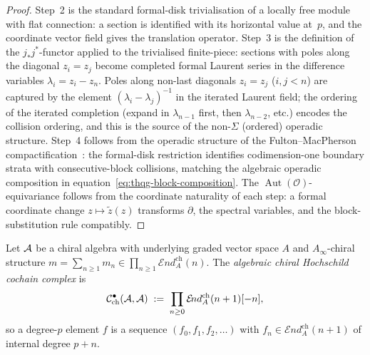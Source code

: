 \begin{proof}
Step~2 is the standard formal-disk trivialisation of a locally
free module with flat connection: a section is identified with its
horizontal value at~$p$, and the coordinate vector field gives the
translation operator. Step~3 is the definition of the
$j_* j^*$-functor applied to the trivialised finite-piece: sections
with poles along the diagonal $z_i = z_j$ become completed formal
Laurent series in the difference variables $\lambda_i = z_i - z_n$.
Poles along non-last diagonals $z_i = z_j$ ($i, j < n$) are
captured by the element $(\lambda_i - \lambda_j)^{-1}$ in the
iterated Laurent field; the ordering of the iterated completion
(expand in $\lambda_{n-1}$ first, then $\lambda_{n-2}$, etc.)
encodes the collision ordering, and this is the source of the
non-$\Sigma$ (ordered) operadic structure.
Step~4 follows from the operadic structure of the
Fulton--MacPherson compactification~\cite{FM94}: the formal-disk
restriction identifies codimension-one boundary strata with
consecutive-block collisions, matching the algebraic operadic
composition in equation~\eqref{eq:thqg-block-composition}. The
$\operatorname{Aut}(\mathcal{O})$-equivariance follows from the
coordinate naturality of each step: a formal coordinate change
$z \mapsto \tilde{z}(z)$ transforms $\partial$, the spectral
variables, and the block-substitution rule compatibly.
\end{proof}

\begin{definition}
\label{def:thqg-algebraic-hochschild}
Let $\mathcal{A}$ be a chiral algebra with underlying graded vector space $A$
and $A_\infty$-chiral structure
$m = \sum_{n \ge 1} m_n \in \prod_{n \ge 1}
\mathcal{E}\!nd^{\mathrm{ch}}_A(n)$.
The \emph{algebraic chiral Hochschild cochain complex} is
\begin{equation}\label{eq:thqg-algebraic-hochschild}
\mathcal{C}^{\bullet}_{\mathrm{ch}}(\mathcal{A}, \mathcal{A})
\;:=\;
\prod_{n \ge 0}
\mathcal{E}\!nd^{\mathrm{ch}}_A(n+1)[-n],
\end{equation}
so a degree-$p$ element $f$ is a sequence
$(f_0, f_1, f_2, \ldots)$ with
$f_n \in \mathcal{E}\!nd^{\mathrm{ch}}_A(n+1)$ of internal degree
$p + n$.
\end{definition}

